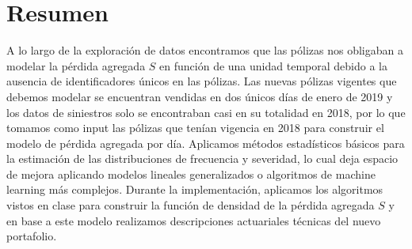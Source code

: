 \section*{Resumen}

A lo largo de la exploración de datos encontramos que las pólizas nos obligaban a modelar la pérdida agregada $S$ en función de una unidad temporal debido a la ausencia de identificadores únicos en las pólizas. Las nuevas pólizas vigentes que debemos modelar se encuentran vendidas en dos únicos días de enero de 2019 y los datos de siniestros solo se encontraban casi en su totalidad en 2018, por lo que tomamos como input las pólizas que tenían vigencia en 2018 para construir el modelo de pérdida agregada por día. Aplicamos métodos estadísticos básicos para la estimación de las distribuciones de frecuencia y severidad, lo cual deja espacio de mejora aplicando modelos lineales generalizados o algoritmos de machine learning más complejos. Durante la implementación, aplicamos los algoritmos vistos en clase para construir la función de densidad de la pérdida agregada $S$ y en base a este modelo realizamos descripciones actuariales técnicas del nuevo portafolio. 